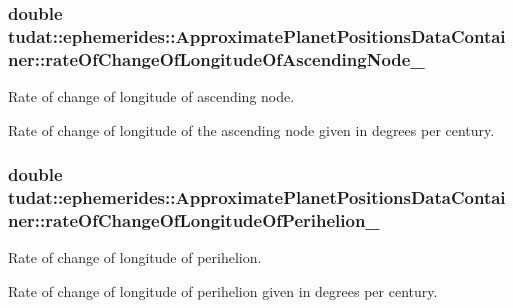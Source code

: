 \subsubsection[{\texorpdfstring{rate\+Of\+Change\+Of\+Longitude\+Of\+Ascending\+Node\+\_\+}{rateOfChangeOfLongitudeOfAscendingNode_}}]{\setlength{\rightskip}{0pt plus 5cm}double tudat\+::ephemerides\+::\+Approximate\+Planet\+Positions\+Data\+Container\+::rate\+Of\+Change\+Of\+Longitude\+Of\+Ascending\+Node\+\_\+}\hypertarget{structtudat_1_1ephemerides_1_1ApproximatePlanetPositionsDataContainer_a6ff272075cdadb6cbe5268ace4cfb79b}{}\label{structtudat_1_1ephemerides_1_1ApproximatePlanetPositionsDataContainer_a6ff272075cdadb6cbe5268ace4cfb79b}


Rate of change of longitude of ascending node. 

Rate of change of longitude of the ascending node given in degrees per century. 
\subsubsection[{\texorpdfstring{rate\+Of\+Change\+Of\+Longitude\+Of\+Perihelion\+\_\+}{rateOfChangeOfLongitudeOfPerihelion_}}]{\setlength{\rightskip}{0pt plus 5cm}double tudat\+::ephemerides\+::\+Approximate\+Planet\+Positions\+Data\+Container\+::rate\+Of\+Change\+Of\+Longitude\+Of\+Perihelion\+\_\+}\hypertarget{structtudat_1_1ephemerides_1_1ApproximatePlanetPositionsDataContainer_a9cc926b0ec785d207bf3dc9b9ac011bd}{}\label{structtudat_1_1ephemerides_1_1ApproximatePlanetPositionsDataContainer_a9cc926b0ec785d207bf3dc9b9ac011bd}


Rate of change of longitude of perihelion. 

Rate of change of longitude of perihelion given in degrees per century. 
